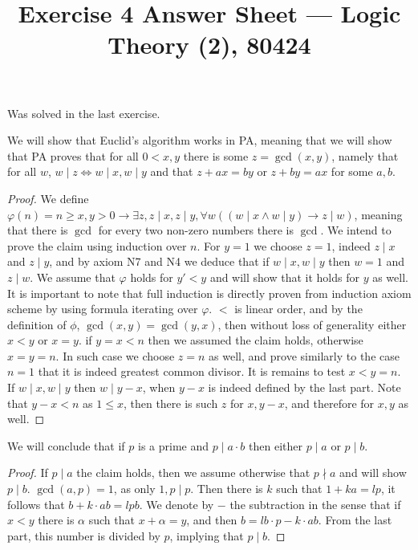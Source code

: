 
\title{Exercise 4 Answer Sheet --- Logic Theory (2), 80424}


\maketitle
\maketitleprint{}

\question{}
\subquestion{}
Was solved in the last exercise.

\subquestion{}
We will show that Euclid's algorithm works in PA,
meaning that we will show that PA proves that for all $0 < x, y$ there is some $z = \gcd(x, y)$, namely that for all $w$, $w \mid z \iff w \mid x, w \mid y$ and that $z + ax = by$ or $z + by = ax$ for some $a, b$.
\begin{proof}
	We define $\varphi(n) = n \ge x, y > 0 \rightarrow \exists z, z \mid x, z \mid y, \forall w ((w \mid x \land w \mid y) \rightarrow z \mid w)$, meaning that there is $\gcd$ for every two non-zero numbers there is $\gcd$.
	We intend to prove the claim using induction over $n$.
	For $y = 1$ we choose $z = 1$, indeed $z \mid x$ and $z \mid y$, and by axiom N7 and N4 we deduce that if $w \mid x, w \mid y$ then $w = 1$ and $z \mid w$.
	We assume that $\varphi$ holds for $y' < y$ and will show that it holds for $y$ as well.
	It is important to note that full induction is directly proven from induction axiom scheme by using formula iterating over $\varphi$.
	$<$ is linear order, and by the definition of $\phi$, $\gcd(x, y) = \gcd(y, x)$, then without loss of generality either $x < y$ or $x = y$.
	if $y = x < n$ then we assumed the claim holds, otherwise $x = y = n$.
	In such case we choose $z = n$ as well, and prove similarly to the case $n = 1$ that it is indeed greatest common divisor.
	It is remains to test $x < y = n$.
	If $w \mid x, w \mid y$ then $w \mid y - x$, when $y - x$ is indeed defined by the last part.
	Note that $y - x < n$ as $1 \le x$, then there is such $z$ for $x, y - x$, and therefore for $x, y$ as well.
\end{proof}

\subquestion{}
We will conclude that if $p$ is a prime and $p \mid a \cdot b$ then either $p \mid a$ or $p \mid b$.
\begin{proof}
	If $p \mid a$ the claim holds, then we assume otherwise that $p \nmid a$ and will show $p \mid b$.
	$\gcd(a, p) = 1$, as only $1, p \mid p$.
	Then there is $k$ such that $1 + k a = l p$, it follows that $b + k \cdot ab = l p b$.
	We denote by $-$ the subtraction in the sense that if $x < y$ there is $\alpha$ such that $x + \alpha = y$, and then $b = lb \cdot p - k \cdot a b$.
	From the last part, this number is divided by $p$, implying that $p \mid b$.
\end{proof}

